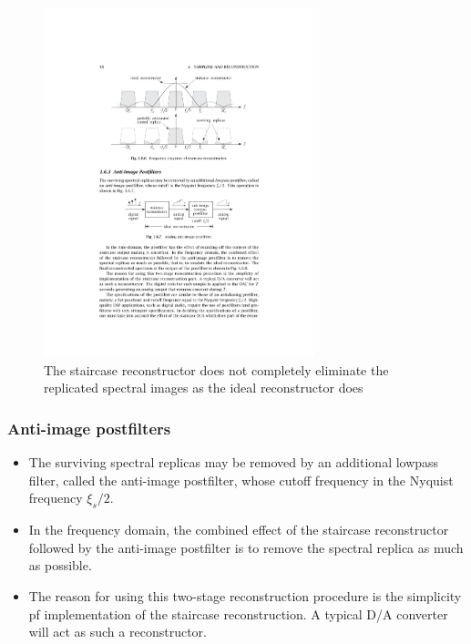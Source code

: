 \begin{frame}
\begin{figure}
  \centering
  \includegraphics[width=0.7\textwidth]{staircasespectrum}
  \caption{The staircase reconstructor does not completely eliminate the replicated spectral images as the ideal reconstructor does}
\end{figure}
\end{frame}

\begin{frame}
\frametitle{Anti-image postfilters}
\begin{itemize}
\item The surviving spectral replicas may be removed by an additional \alert{lowpass filter}, called the \alert{anti-image postfilter},
whose cutoff frequency in the Nyquist frequency $\xi_s/2$.
\item In the frequency domain, the combined effect of the staircase reconstructor followed by the anti-image postfilter is to remove the spectral replica as much as possible.
\item The reason for using this two-stage reconstruction procedure is the \alert{simplicity} pf implementation of the staircase reconstruction. A typical D/A converter will act as such a reconstructor.
\end{itemize}
\end{frame}

